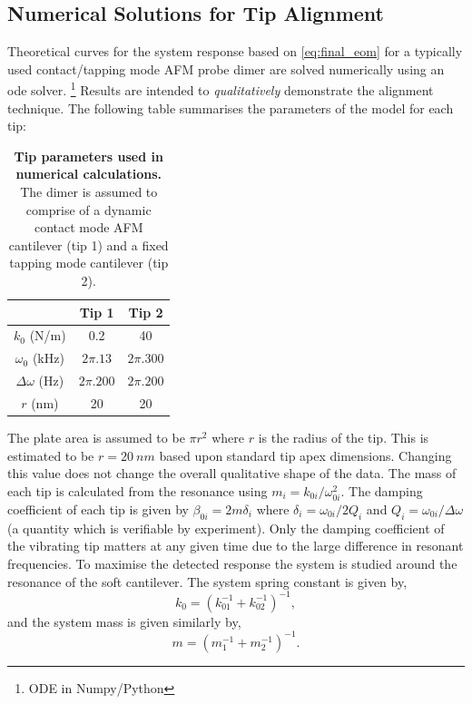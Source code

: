 \documentclass{article}
\begin{document}
\subsection{Numerical Solutions for Tip Alignment}

Theoretical curves for the system response based on \eqref{eq:final_eom} for a typically used contact/tapping mode AFM probe dimer are solved numerically using an \gls{ode} solver.%
\footnote{ODE in Numpy/Python}
Results are intended to \textit{qualitatively} demonstrate the alignment technique.
The following table summarises the parameters of the model for each tip:
\begin{table}[H]
\begin{center}
\begin{tabular}{c | c | c}
\hline
& \textbf{Tip 1} & \textbf{Tip 2} \\
\hline                 
$k_0$ (N/m) & 0.2 & 40 \\
$\omega_0$ (kHz) & $2\pi.13$ & $2\pi.300$ \\
$\Delta\omega$ (Hz) & $2\pi.200$ & $2\pi.200$ \\
$r$ (nm) & 20 & 20 \\
\hline 
\end{tabular}
\end{center}
\caption[Tip parameters used in numerical calculations]{\textbf{Tip parameters used in numerical calculations.} The dimer is assumed to comprise of a dynamic contact mode AFM cantilever (tip 1) and a fixed tapping mode cantilever (tip 2).}
\vspace{-10pt}
\end{table}
The plate area is assumed to be $\pi r^2$ where $r$ is the radius of the tip. This is estimated to be $r=\SI{20}{nm}$ based upon standard tip apex dimensions. Changing this value does not change the overall qualitative shape of the data. The mass of each tip is calculated from the resonance using $m_i = k_{0i}/\omega_{0i}^2$. The damping coefficient of each tip is given by $\beta_{0i} = 2m\delta_i$ where $\delta_i = \omega_{0i}/2Q_i$ and $Q_i = \omega_{0i}/\Delta\omega$ (a quantity which is verifiable by experiment). Only the damping coefficient of the vibrating tip matters at any given time due to the large difference in resonant frequencies. To maximise the detected response the system is studied around the resonance of the soft cantilever.
The system spring constant is given by,
\begin{equation}
	k_0 = \left( k_{01}^{-1} + k_{02}^{-1} \right)^{-1},
\end{equation}
and the system mass is given similarly by,
\begin{equation}
	m = \left( m_1^{-1} + m_2^{-1} \right)^{-1}.
\end{equation}
\end{document}
